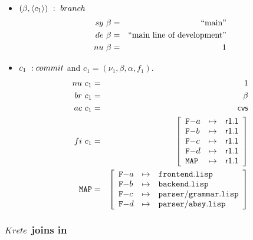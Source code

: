 \documentclass[fleqn, 10pt, a4paper]{report} \usepackage{amssymb}
\begin{document}
\begin{itemize}
\item $(\beta, \langle c_1\rangle)\ :\ \mathnormal{branch}$
  \begin{eqnarray*}
    \mathnormal{sy}\ \beta &=& \mbox{``main''} \\
    \mathnormal{de}\ \beta &=& \mbox{``main line of development''} \\
    \mathnormal{nu}\ \beta &=& 1 \\
  \end{eqnarray*}

\item $c_1\ :\mathnormal{commit}$ and $c_1=(\nu_1, \beta, \alpha,
  f_1)$.
  \begin{eqnarray*}
    \mathnormal{nu}\ c_1 &=& 1 \\
    \mathnormal{br}\ c_1 &=& \beta \\
    \mathnormal{ac}\ c_1 &=& \mathsf{cvs} \\
    \mathnormal{fi}\ c_1 &=& \left[
      \begin{array}{lcl}
        \mathtt{F-}a & \mapsto & \mathsf{r1.1} \\
        \mathtt{F-}b & \mapsto & \mathsf{r1.1} \\
        \mathtt{F-}c & \mapsto & \mathsf{r1.1} \\
        \mathtt{F-}d & \mapsto & \mathsf{r1.1} \\
        \mathtt{MAP} & \mapsto & \mathsf{r1.1} \\
      \end{array}\right] \\
    \mathtt{MAP} &=& \left[
      \begin{array}{lcl}
        \mathtt{F-}a &\mapsto& \mathtt{frontend.lisp} \\
        \mathtt{F-}b &\mapsto& \mathtt{backend.lisp} \\
        \mathtt{F-}c &\mapsto& \mathtt{parser/grammar.lisp} \\
        \mathtt{F-}d &\mapsto& \mathtt{parser/absy.lisp} \\
      \end{array}\right]
  \end{eqnarray*}
\end{itemize}

\subsubsection{$\mathnormal{Krete}$ joins in}
\end{document}
